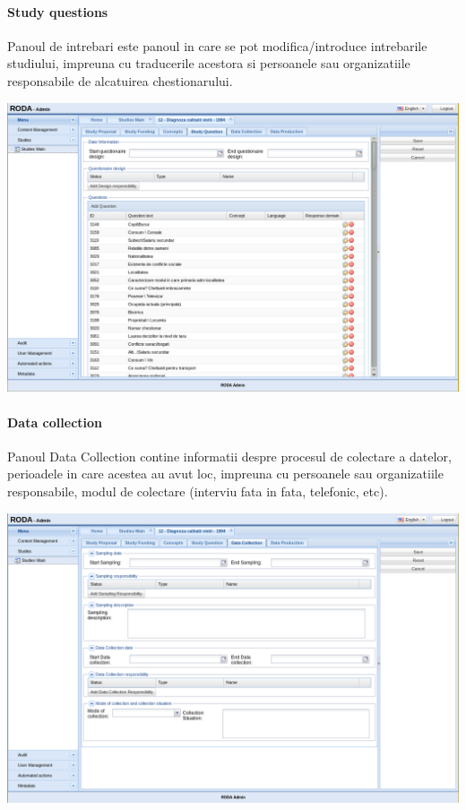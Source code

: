 \paragraph{Study questions}

Panoul de intrebari este panoul in care se pot modifica/introduce intrebarile studiului, impreuna cu traducerile acestora si persoanele sau organizatiile responsabile de alcatuirea chestionarului. 

\includegraphics[width=16cm]{img/studyedit-questions}

\paragraph{Data collection}

Panoul Data Collection contine informatii despre procesul de colectare a datelor, perioadele in care acestea au avut loc, impreuna cu persoanele sau organizatiile responsabile, modul de colectare (interviu fata in fata, telefonic, etc). 

\includegraphics[width=16cm]{img/studyedit-datacollection}

